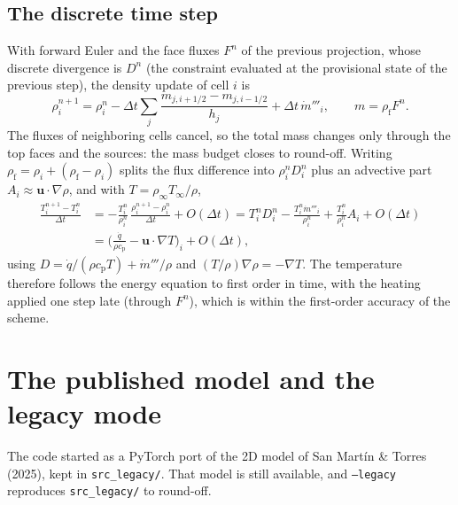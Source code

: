 \documentclass[11pt,a4paper]{article}
\newcommand{\vu}{\mathbf{u}}
\newcommand{\code}[1]{\texttt{#1}}
\begin{document}
\subsection{The discrete time step}
With forward Euler and the face fluxes $F^n$ of the previous projection, whose discrete divergence is
$D^n$ (the constraint evaluated at the provisional state of the previous step), the density update of
cell $i$ is
\begin{equation}
  \rho_i^{n+1}=\rho_i^n-\Delta t\sum_j\frac{m_{j,i+1/2}-m_{j,i-1/2}}{h_j}+\Delta t\,\dot m'''_i,
  \qquad m=\rho_\text{f}F^n.
\end{equation}
The fluxes of neighboring cells cancel, so the total mass changes only through the top faces and the
sources: the mass budget closes to round-off. Writing $\rho_\text{f}=\rho_i+(\rho_\text{f}-\rho_i)$ splits
the flux difference into $\rho_i^nD_i^n$ plus an advective part $A_i\approx\vu\cdot\nabla\rho$, and with
$T=\rho_\infty T_\infty/\rho$,
\begin{align}
  \frac{T_i^{n+1}-T_i^n}{\Delta t}&=-\frac{T_i^n}{\rho_i^n}\,\frac{\rho_i^{n+1}-\rho_i^n}{\Delta t}+O(\Delta t)
  =T_i^nD_i^n-\frac{T_i^n\dot m'''_i}{\rho_i^n}+\frac{T_i^n}{\rho_i^n}A_i+O(\Delta t)\nonumber\\[4pt]
  &=\Big(\frac{\dot q}{\rho c_\text{p}}-\vu\cdot\nabla T\Big)_i+O(\Delta t),
\end{align}
using $D=\dot q/(\rho c_\text{p}T)+\dot m'''/\rho$ and $(T/\rho)\nabla\rho=-\nabla T$. The temperature
therefore follows the energy equation to first order in time, with the heating applied one step late
(through $F^n$), which is within the first-order accuracy of the scheme.

\section{The published model and the legacy mode}\label{app:legacy}
The code started as a PyTorch port of the 2D model of San Mart\'in \& Torres (2025), kept in
\code{src\_legacy/}. That model is still available, and \code{--legacy} reproduces \code{src\_legacy/}
to round-off.
\end{document}
